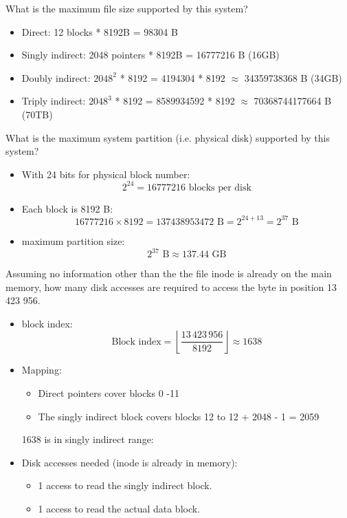\documentclass{article}
\begin{document}
\begin{enumerate}[label=\textbf{\makebox[1cm][l]{\Huge\text{(\stylishfont\alph*)}}}, leftmargin=!, labelindent=0pt]
    \item What is the maximum file size supported by this system?
    
    \begin{itemize}
        \item Direct: 12 blocks * 8192B = 98304 B
        \item Singly indirect: 2048 pointers * 8192B = 16777216 B (16GB)
        \item Doubly indirect: \(2048^2\) * 8192 = 4194304 * 8192 \(\approx\) 34359738368 B (34GB)
        \item Triply indirect: \(2048^3\) * 8192 = 8589934592 * 8192 \(\approx\) 70368744177664 B (70TB)
    \end{itemize}
    
    \item What is the maximum system partition (i.e. physical disk) supported by this
    system?
    \begin{itemize}
        \item With 24 bits for physical block number:
          \[
          2^{24} = 16777216 \text{ blocks per disk}
          \]
        \item Each block is 8192 B:
          \[
          16777216 \times 8192 = 137438953472 \text{ B} = 2^{24+13} = 2^{37} \text{ B}
          \]
        \item maximum partition size:
          \[
          2^{37} \text{ B} \approx 137.44 \text{ GB}
          \]
      \end{itemize}

    \item Assuming no information other than the the file inode is already on
    the main memory, how many disk accesses are required to access the byte in
    position 13 423 956.

    \begin{itemize}[leftmargin=2em]
        \item block index:  
          \[
          \text{Block index} = \left\lfloor \frac{13\,423\,956}{8192} \right\rfloor \approx 1638
          \]
        \item Mapping:
          \begin{itemize}
            \item Direct pointers cover blocks 0 -11
            \item The singly indirect block covers blocks 12 to 12 + 2048 - 1 = 2059
          \end{itemize}
          1638 is in singly indirect range:
        \item Disk accesses needed (inode is already in memory):
          \begin{itemize}
            \item 1 access to read the singly indirect block.
            \item 1 access to read the actual data block.
          \end{itemize}
      \end{itemize}
\end{enumerate}

\newpage
\printbibliography
\end{document}
